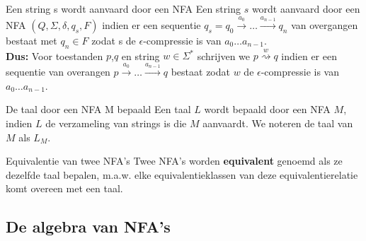 \begin{theo}{Een string s wordt aanvaard door een NFA}
    Een string $s$ wordt aanvaard door een NFA $(Q,\Sigma, \delta, q_s, F)$ indien
    er een sequentie $q_s = q_0 \overset{a_0}{\to} \ldots \overset{a_{n-1}}{\to} q_n$
    van overgangen bestaat met $q_n \in F$ zodat s de $\epsilon$-compressie is van $a_0 \ldots a_{n-1}$. \\
    
    \noindent \textbf{Dus:} Voor toestanden $p$,$q$ en string $w \in \Sigma^*$ schrijven we $p \overset{w}{\rightsquigarrow} q$
    indien er een sequentie van overangen $ p \overset{a_0}{\to} \ldots \overset{a_{n-1}}{\to} q$ bestaat zodat $w$
    de $\epsilon$-compressie is van $a_0 \ldots a_{n-1}$.
\end{theo}

\begin{theo}{De taal door een NFA M bepaald}
    Een taal $L$ wordt bepaald door een NFA $M$, indien $L$ de verzameling van strings is die $M$ aanvaardt.
    We noteren de taal van $M$ als $L_M$.
\end{theo}

\begin{theo}{Equivalentie van twee NFA's}
    Twee NFA's worden \textbf{equivalent} genoemd als ze dezelfde taal bepalen, m$.$a$.$w$.$ elke equivalentieklassen van deze equivalentierelatie komt overeen met een taal.
\end{theo}

\newpage

\subsection{De algebra van NFA's}

\vspace{0.5cm}

